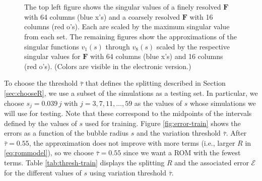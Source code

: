 \documentclass[final]{siamltex}
\providecommand{\mat}[1]{\boldsymbol{#1}}
\providecommand{\mF}{\ensuremath{\mat{F}}}
\begin{document}
\begin{figure}[ht]
\centering
{}\;
\subfloat[$\sigma_1 v_1(s)$]{
\texttt{[image: v1]}\label{fig:svals-rm}
}\;
\subfloat[$\sigma_2 v_2(s)$]{
\texttt{[image: v2]}
}\\
\subfloat[$\sigma_3 v_3(s)$]{
\texttt{[image: v3]}
}\:
\subfloat[$\sigma_4 v_4(s)$]{
\texttt{[image: v4]}
}\;
\subfloat[$\sigma_5 v_5(s)$]{
\texttt{[image: v5]}
}\\
\subfloat[$\sigma_6 v_6(s)$]{
\texttt{[image: v6]}
}\;
\subfloat[$\sigma_7 v_7(s)$]{
\texttt{[image: v7]}
}\;
\subfloat[$\sigma_8 v_8(s)$]{
\texttt{[image: v8]}
}
\caption{The top left figure shows the singular values of a finely
  resolved $\mF$ with 64 columns (blue x's) and a coarsely resolved
  $\mF$ with 16 columns (red o's). Each are scaled by the maximum
  singular value from each set. The remaining figures show the
  approximations of the singular functions $v_1(s)$ through $v_8(s)$
  scaled by the respective singular values for $\mF$ with 64 columns
  (blue x's) and 16 columns (red o's). (Colors are visible in the
  electronic version.) }
\label{fig:tempsvd}
\end{figure} 

To choose the threshold $\bar{\tau}$ that defines the splitting
described in Section \ref{sec:chooseR}, we use a subset of the
simulations as a testing set. In particular, we choose $s_j =
0.039\,j$ with $j=3,7,11,\dots,59$ as the values of $s$ whose
simulations we will use for testing. Note that these correspond to the
midpoints of the intervals defined by the values of $s$ used for
training. Figure \ref{fig:error-train} shows the errors as a function
of the bubble radius $s$ and the variation threshold
$\bar{\tau}$. After $\bar{\tau}=0.55$, the approximation does not
improve with more terms (i.e., larger $R$ in \eqref{eq:rommodel}), so
we choose $\bar{\tau}=0.55$ since we want a ROM with the fewest terms.
Table \ref{tab:thresh-train} displays the splitting $R$ and the
associated error ${\mathcal{E}}$ for the different values of $s$ using variation
threshold $\bar{\tau}$.
\end{document}

